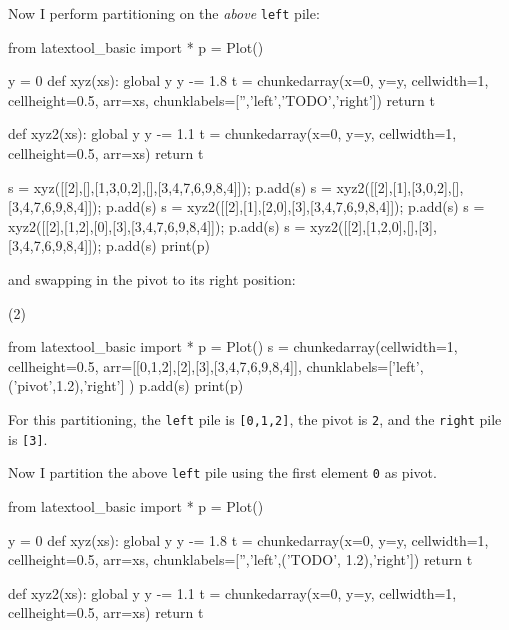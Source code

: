 \begin{ex}
Now I perform partitioning on the \textit{above} \verb!left! pile:
{\small
\begin{python}
from latextool_basic import *
p = Plot()

y = 0
def xyz(xs):
    global y
    y -= 1.8
    t = chunkedarray(x=0, y=y,
                        cellwidth=1, 
                        cellheight=0.5,
                        arr=xs,
                        chunklabels=['','left','TODO','right'])
    return t

def xyz2(xs):
    global y
    y -= 1.1
    t = chunkedarray(x=0, y=y,
                        cellwidth=1, 
                        cellheight=0.5,
                        arr=xs)
    return t

s = xyz([[2],[],[1,3,0,2],[],[3,4,7,6,9,8,4]]); p.add(s)
s = xyz2([[2],[1],[3,0,2],[],[3,4,7,6,9,8,4]]); p.add(s)
s = xyz2([[2],[1],[2,0],[3],[3,4,7,6,9,8,4]]); p.add(s)
s = xyz2([[2],[1,2],[0],[3],[3,4,7,6,9,8,4]]); p.add(s)
s = xyz2([[2],[1,2,0],[],[3],[3,4,7,6,9,8,4]]); p.add(s)
print(p)
\end{python}
}

and swapping in the pivot to its right position:
\begin{center}
(2)
\end{center}
{\small
\begin{python}
from latextool_basic import *
p = Plot()
s = chunkedarray(cellwidth=1, 
                   cellheight=0.5,
                   arr=[[0,1,2],[2],[3],[3,4,7,6,9,8,4]],
                   chunklabels=['left',('pivot',1.2),'right']
)
p.add(s)
print(p)
\end{python}
}
For this partitioning, 
the \verb!left! pile is \verb![0,1,2]!, the pivot is \verb!2!, and
the \verb!right! pile is \verb![3]!.

Now I partition the above \verb!left! pile using the first element
\verb!0! as pivot.
{\small
\begin{python}
from latextool_basic import *
p = Plot()

y = 0
def xyz(xs):
    global y
    y -= 1.8
    t = chunkedarray(x=0, y=y,
                        cellwidth=1, 
                        cellheight=0.5,
                        arr=xs,
                        chunklabels=['','left',('TODO', 1.2),'right'])
    return t

def xyz2(xs):
    global y
    y -= 1.1
    t = chunkedarray(x=0, y=y,
                        cellwidth=1, 
                        cellheight=0.5,
                        arr=xs)
    return t


\end{python}}
\end{ex}
